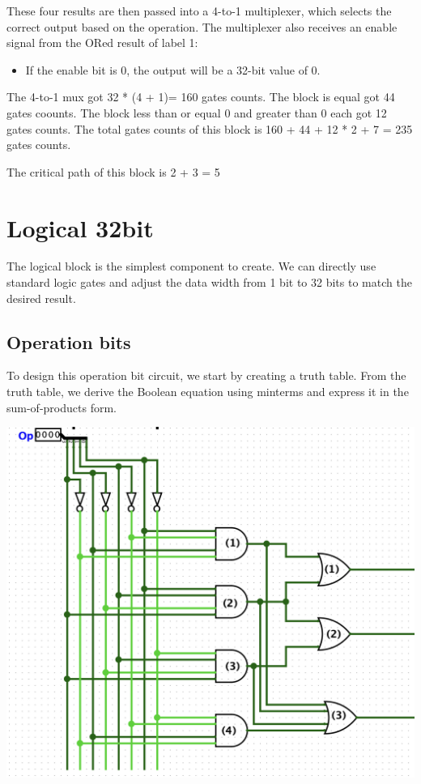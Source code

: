 \documentclass{article}
\begin{document}
\noindent These four results are then passed into a 4-to-1 multiplexer, which selects the correct output based on the operation. The multiplexer also receives an enable signal from the ORed result of label 1:
\begin{itemize}
    \item If the enable bit is \( 0 \), the output will be a 32-bit value of \( 0 \).
\end{itemize}


\hspace{2em}The 4-to-1 mux got 32 * (4 + 1)= 160 gates counts. The block is equal got 44 gates coounts. The block less than or equal 0 and greater than 0 each got 12 gates counts. The total gates counts of this block is 160 + 44 + 12 * 2 + 7 = 235 gates counts.

\hspace{2em}The critical path of this block is 2 + 3 = 5

\section{Logical 32bit}
\hspace*{2em}The logical block is the simplest component to create. We can directly use standard logic gates and adjust the data width from 1 bit to 32 bits to match the desired result.
\subsection{Operation bits}
\hspace{2em} To design this operation bit circuit, we start by creating a truth table. From the truth table, we derive the Boolean equation using minterms and express it in the sum-of-products form.
\begin{center}
    \includegraphics[width=1\textwidth]{images/LogicalSelectionBits.png}
\end{center}
\end{document}
